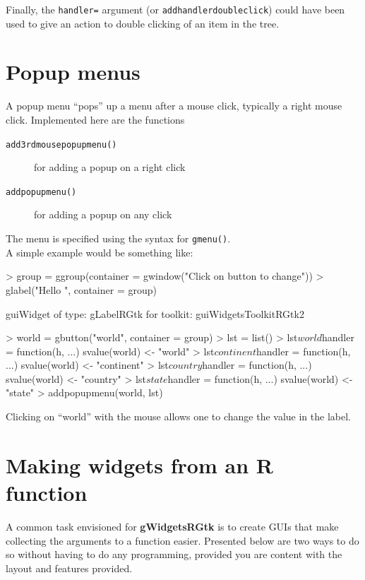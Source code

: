 \documentclass[12pt]{article}
\newcommand{\RCode}[1]{\texttt{#1}}
\newcommand{\RFunc}[1]{\texttt{#1()}}
\newcommand{\RPackage}[1]{\textbf{#1}}
\newcommand{\RArg}[1]{\texttt{#1=}}
\begin{document}
Finally, the  \RArg{handler} argument (or
\RCode{addhandlerdoubleclick}) could have been used to give an action to double
clicking of an item in the tree. 



\section{Popup menus}

A popup menu ``pops'' up a menu after a mouse click, typically a right
mouse click. Implemented here are the functions

\begin{description}
\item[\RFunc{add3rdmousepopupmenu}] for adding a popup on a right click
\item[\RFunc{addpopupmenu}] for adding a popup on any click
\end{description}

The menu is specified using the syntax for \RFunc{gmenu}.
\\


A simple example would be something like:

\begin{Schunk}
\begin{Sinput}
> group = ggroup(container = gwindow("Click on button to change"))
> glabel("Hello ", container = group)
\end{Sinput}
\begin{Soutput}
guiWidget of type: gLabelRGtk for toolkit: guiWidgetsToolkitRGtk2 
\end{Soutput}
\begin{Sinput}
> world = gbutton("world", container = group)
> lst = list()
> lst$world$handler = function(h, ...) svalue(world) <- "world"
> lst$continent$handler = function(h, ...) svalue(world) <- "continent"
> lst$country$handler = function(h, ...) svalue(world) <- "country"
> lst$state$handler = function(h, ...) svalue(world) <- "state"
> addpopupmenu(world, lst)
\end{Sinput}
\end{Schunk}
Clicking on ``world'' with the mouse allows one to change the value in
the label.

\section{Making  widgets from an R function}

A common task envisioned for \RPackage{gWidgetsRGtk} is to create GUIs
that make collecting the arguments to a function easier. Presented
below are two ways to do so without having to do any programming,
provided you are content with the layout and features provided.
\end{document}

